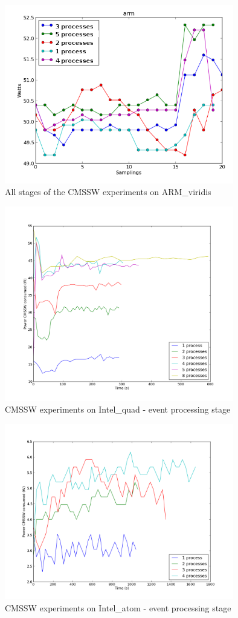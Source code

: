 \begin{figure}[h!]
  \centering
    \includegraphics[width=100mm]{"img/aalto/aalto_total_arm"}
    \caption{All stages of the CMSSW experiments on ARM\_viridis}
    \label{fig:aalto_arm_clamp}
\end{figure}



\begin{figure}[h!]
  \centering
    \includegraphics[width=100mm]{"img/aalto/aalto_quadEvents"}
    \caption{CMSSW experiments on Intel\_quad - event processing stage}
    \label{fig:aalto_quad_events}
\end{figure}

\begin{figure}[h!]
  \centering
    \includegraphics[width=100mm]{"img/aalto/aalto_atomEvents"}
    \caption{CMSSW experiments on Intel\_atom - event processing stage}
    \label{fig:aalto_atom_events}
\end{figure}

